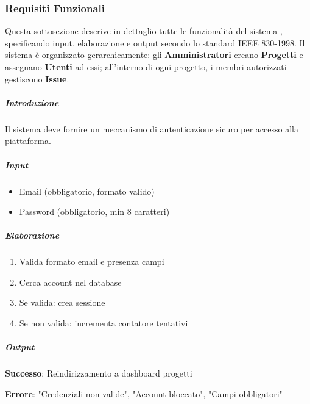 \subsubsection{Requisiti Funzionali}
\label{subsec:requisiti-funzionali}

Questa sottosezione descrive in dettaglio tutte le funzionalità del sistema \productname, specificando input, elaborazione e output secondo lo standard IEEE 830-1998. Il sistema è organizzato gerarchicamente: gli \textbf{Amministratori} creano \textbf{Progetti} e assegnano \textbf{Utenti} ad essi; all'interno di ogni progetto, i membri autorizzati gestiscono \textbf{Issue}.

\vspace{0.5cm}


\begin{reqbox}[title=REQ-FUN-01: Autenticazione]
\label{subsubsec:req-autenticazione}

\subparagraph{Introduzione}
Il sistema deve fornire un meccanismo di autenticazione sicuro per accesso alla piattaforma.

\subparagraph{Input}
\begin{itemize}[leftmargin=1.1em]
\item Email (obbligatorio, formato valido)
\item Password (obbligatorio, min 8 caratteri)
\end{itemize}

\subparagraph{Elaborazione}
\begin{enumerate}[leftmargin=1.1em]
\item Valida formato email e presenza campi
\item Cerca account nel database
\item Se valida: crea sessione
\item Se non valida: incrementa contatore tentativi
\end{enumerate}

\subparagraph{Output}
\textbf{Successo}: Reindirizzamento a dashboard progetti

\textbf{Errore}: "Credenziali non valide", "Account bloccato", "Campi obbligatori"

\end{reqbox}

